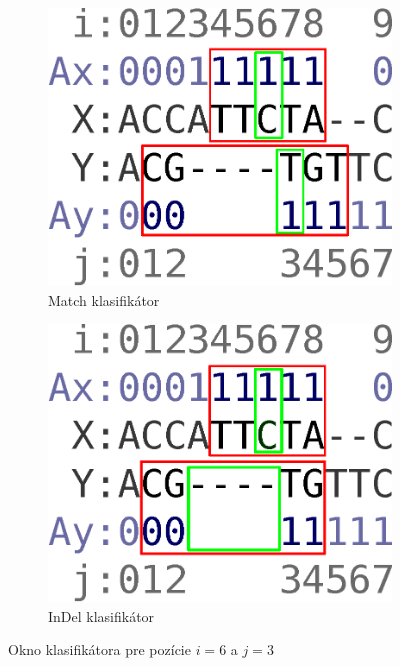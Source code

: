 \documentclass[myposter,portrait]{sciposter}
\begin{document}
\begin{multicols*}{3}
\begin{figure}[h]
        \centering
        \begin{subfigure}[b]{0.35\textwidth}
                \includegraphics[width=\textwidth]{images/window_m}
                \caption{Match klasifikátor}
                \label{fig:window-m}
        \end{subfigure}%
        \qquad\qquad %
        \begin{subfigure}[b]{0.35\textwidth}
                \includegraphics[width=\textwidth]{images/window_i}
                \caption{InDel klasifikátor}
                \label{fig:window-i}
        \end{subfigure}
        \caption[Okno klasifikátora]{Okno klasifikátora pre pozície $i = 6$ a $j = 3$}
\end{figure}



\end{multicols*}
\end{document}
